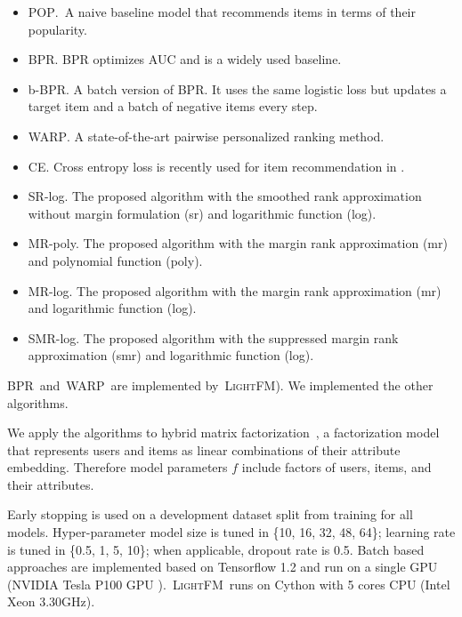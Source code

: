 \documentclass[letterpaper]{article} %
\newcommand{\lightfm}{\textsc{LightFM}}
\newcommand{\pop}{\textsc{POP}}
\newcommand{\awarp}{\textsc{WARP}}
\newcommand{\bbpr}{b-BPR}
\newcommand{\bpr}{BPR}
\begin{document}
\begin{itemize}
\item \pop.~A naive baseline model that recommends items in terms of their popularity.
\item \bpr\cite{rendle2009bpr}. BPR optimizes AUC and is a widely used baseline.
\item \bbpr. A batch version of BPR. It uses the same logistic loss but updates a target item and a batch of negative items every step.%
\item \awarp\cite{weston2010large,hong2013co}. A state-of-the-art pairwise personalized ranking method.
\item CE. Cross entropy loss is recently used for item recommendation in \cite{hidasi2015session,covington2016deep}. %
\item SR-log. The proposed algorithm with the smoothed rank approximation without margin formulation (sr) and logarithmic function (log).
\item MR-poly. The proposed algorithm with the margin rank approximation (mr) and polynomial function (poly).
\item MR-log. The proposed algorithm with the margin rank approximation (mr) and logarithmic function (log).
\item SMR-log. The proposed algorithm with the suppressed margin rank approximation (smr) and logarithmic function (log).
\end{itemize}

\bpr~and~\awarp~are implemented by~\lightfm \cite{kula_metadata_2015}). We implemented the other algorithms.

We apply the algorithms to hybrid matrix factorization~\cite{shmueli2012care}, a factorization model that represents users and items as linear combinations of their attribute embedding. Therefore model parameters $f$ include factors of users, items, and their attributes.

Early stopping is used on a development dataset split from training for all models. Hyper-parameter model size is tuned in \{10, 16, 32, 48, 64\}; learning rate is tuned in \{0.5, 1, 5, 10\}; when applicable, dropout rate is 0.5. Batch based approaches are implemented based on Tensorflow 1.2 and run on a single GPU (NVIDIA Tesla P100 GPU ).~\lightfm~runs on Cython with 5 cores CPU (Intel Xeon 3.30GHz).
\end{document}
